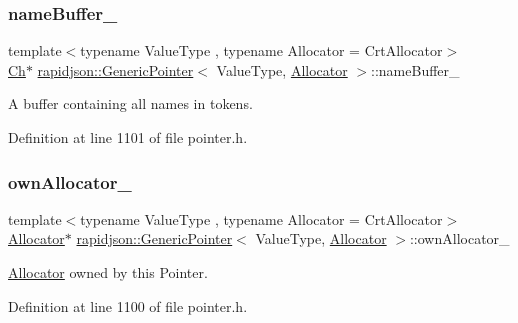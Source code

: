 \subsubsection{\texorpdfstring{nameBuffer\_}{nameBuffer\_}}
{\footnotesize\ttfamily template$<$typename Value\+Type , typename Allocator  = Crt\+Allocator$>$ \\
\mbox{\hyperlink{classrapidjson_1_1_generic_pointer_a850f78846c5548565f8395be5f3427b7}{Ch}}$\ast$ \mbox{\hyperlink{classrapidjson_1_1_generic_pointer}{rapidjson\+::\+Generic\+Pointer}}$<$ Value\+Type, \mbox{\hyperlink{classrapidjson_1_1_allocator}{Allocator}} $>$\+::name\+Buffer\+\_\+}



A buffer containing all names in tokens. 



Definition at line 1101 of file pointer.\+h.

\mbox{\label{classrapidjson_1_1_generic_pointer_a8798d7fdb02cd5b95bf032760aed8445}} 
\subsubsection{\texorpdfstring{ownAllocator\_}{ownAllocator\_}}
{\footnotesize\ttfamily template$<$typename Value\+Type , typename Allocator  = Crt\+Allocator$>$ \\
\mbox{\hyperlink{classrapidjson_1_1_allocator}{Allocator}}$\ast$ \mbox{\hyperlink{classrapidjson_1_1_generic_pointer}{rapidjson\+::\+Generic\+Pointer}}$<$ Value\+Type, \mbox{\hyperlink{classrapidjson_1_1_allocator}{Allocator}} $>$\+::own\+Allocator\+\_\+}



\mbox{\hyperlink{classrapidjson_1_1_allocator}{Allocator}} owned by this Pointer. 



Definition at line 1100 of file pointer.\+h.

\mbox{\label{classrapidjson_1_1_generic_pointer_a20d76ef128abbdd0acd87d2f1fb0ae34}} 
